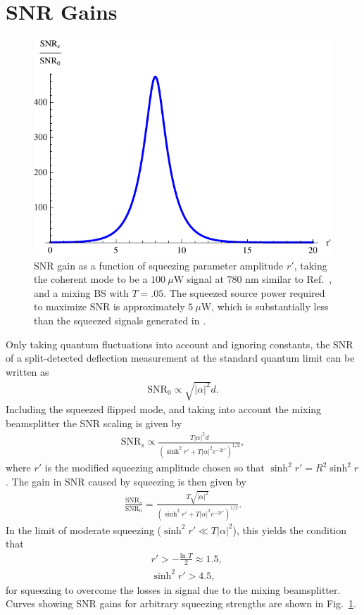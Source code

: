 \section{SNR Gains}
\begin{figure}
  \begin{center}
    \includegraphics[width=\columnwidth]{./SqueezedLight/figures/squeezedsnrgain.pdf}
  \end{center}
  \caption{SNR gain as a function of squeezing parameter amplitude $r'$, taking the coherent mode to be a $100 \: \mu \text{W}$ signal at $780 \text{ nm}$ similar to Ref.~\cite{Dixon2009}, and a mixing BS with $T=.05$.  The squeezed source power required to maximize SNR is approximately $5 \: \mu \text{W}$, which is substantially less than the squeezed signals generated in \cite{Vahlbruch2005,Vahlbruch2008}. }  
  \label{fig:squeezedsnrgain}
\end{figure}
Only taking quantum fluctuations into account and ignoring constants, the SNR of a split-detected deflection measurement at the standard quantum limit can be written as \cite{Barnett2003}
\begin{align}
\text{SNR}_0 \propto \sqrt{|\alpha |^2} d .
\end{align}
Including the squeezed flipped mode, and taking into account the mixing beamsplitter the SNR scaling is given by
\begin{align}
\text{SNR}_s \propto \frac{T|\alpha |^2 d}{(\sinh^2 r' + T|\alpha |^2 e^{-2r'})^{1/2}},
\end{align}
where $r'$ is the modified squeezing amplitude chosen so that $\sinh^2 r' = R^2 \sinh^2 r$.  The gain in SNR caused by squeezing is then given by
\begin{align}
\frac{\text{SNR}_s}{\text{SNR}_0} = \frac{T\sqrt{|\alpha |^2} }{(\sinh^2 r' + T|\alpha |^2 e^{-2r'})^{1/2}}.
\end{align}
In the limit of moderate squeezing ($\sinh^2 r' \ll T|\alpha |^2$), this yields the condition that 
\begin{align}
&r' > -\frac{\text{ln }T}{2} \approx 1.5, \\
&\sinh^2 r' > 4.5,
\end{align}
for squeezing to overcome the losses in signal due to the mixing beamsplitter.  Curves showing SNR gains for arbitrary squeezing strengths are shown in Fig.~\ref{fig:squeezedsnrgain}.

